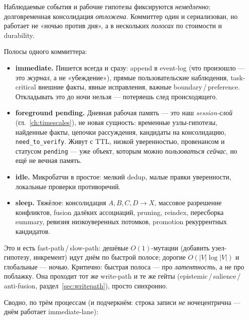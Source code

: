 \begin{principle}
Наблюдаемые события и рабочие гипотезы фиксируются \emph{немедленно}; долговременная
консолидация \emph{отложена}. Коммиттер один и сериализован, но работает не «ночью
против дня», а в нескольких \emph{полосах} по стоимости и durability.
\end{principle}

Полосы одного коммиттера:
\begin{itemize}\itemsep2pt
\item \textbf{immediate.} Пишется всегда и сразу: append в event-log (что произошло —
это \emph{журнал}, а не «убеждение»), прямые пользовательские наблюдения,
task-critical внешние факты, явные исправления, важные boundary\,/\,preference.
Откладывать это до ночи нельзя — потеряешь след происходящего.
\item \textbf{foreground pending.} Дневная рабочая память — это наш \emph{session-слой}
(гл.~\ref{ch:timescales}), не новая сущность: временные узлы-гипотезы, найденные
факты, цепочки рассуждения, кандидаты на консолидацию, \texttt{need\_to\_verify}. Живут
с TTL, низкой уверенностью, провенансом и статусом \texttt{pending} — уже объект,
которым можно \emph{пользоваться сейчас}, но ещё не вечная память.
\item \textbf{idle.} Микробатчи в простое: мелкий dedup, малые правки уверенности,
локальные проверки противоречий.
\item \textbf{sleep.} Тяжёлое: консолидация $A,B,C,D\to X$, массовое разрешение
конфликтов, fusion далёких ассоциаций, pruning, reindex, пересборка summary, ревизия
низкоуверенных потомков, promotion рекуррентных кандидатов.
\end{itemize}
Это и есть fast-path\,/\,slow-path: дешёвые $O(1)$-мутации (добавить узел-гипотезу,
инкремент) идут днём по быстрой полосе; дорогие $O(|V|\log|V|)$ и глобальные — ночью.
Критично: быстрая полоса — про \emph{латентность}, а не про поблажку. Она проходит тот
же write-path и те же гейты (epistemic\,/\,salience\,/\,anti-fusion,
раздел~\ref{sec:writepath}), просто синхронно.

Сводно, по трём процессам (и подчеркнём: строка записи \emph{не} ночецентрична — днём
работает immediate-lane):

